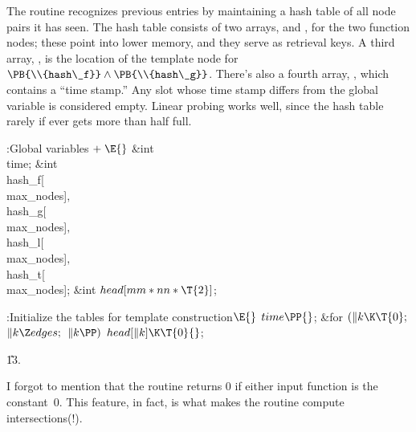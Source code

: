 The  routine recognizes previous
entries by maintaining
a hash table of all node pairs it has seen. The hash table consists of
two arrays,  and , for the two function nodes;
these point
into lower memory, and they serve as retrieval keys.
A third array, , is the location of the template node for
$\PB{\\{hash\_f}}\land\PB{\\{hash\_g}}$.
There's also a fourth array, , which contains a
``time stamp.'' Any slot whose time stamp differs from the global variable
 is considered empty. Linear probing works well, since the hash
table rarely if ever gets more than half full.

\Y\B\4:Global variables\X${}\mathrel+\E{}$\6
\&{int} \\{time};\6
\&{int} \\{hash\_f}[\\{max\_nodes}]${},{}$ \\{hash\_g}[\\{max\_nodes}]${},{}$ %
\\{hash\_l}[\\{max\_nodes}]${},{}$ \\{hash\_t}[\\{max\_nodes}];\6
\&{int} ${}\\{head}[\\{mm}*\\{nn}*\T{2}]{}$;\par
\fi

\B{}:Initialize the tables for template construction\X${}%
\E{}$\6
$\\{time}\PP{}$;\6
\&{for} ${}(\|k\K\T{0};{}$ ${}\|k\Z\\{edges};{}$ ${}\|k\PP){}$\1\5
${}\\{head}[\|k]\K\T{0}{}$;\2\par
\U13.\fi

I forgot to mention that
the  routine returns 0 if either input function is the
constant~0. This feature, in fact, is what makes the  routine
compute intersections(!).


